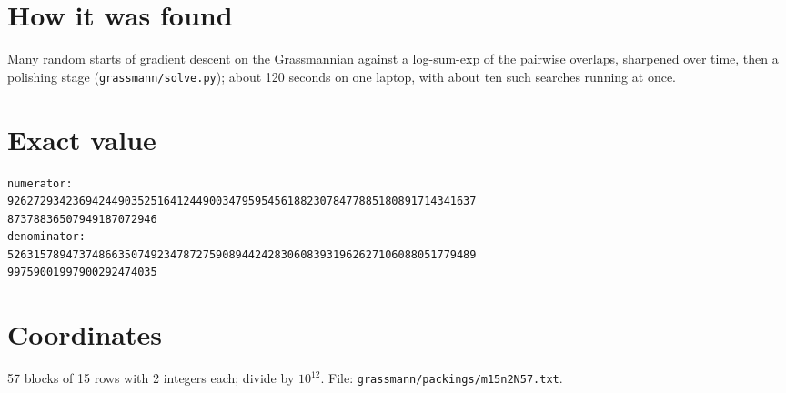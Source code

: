 \documentclass[11pt,a4paper]{article}
\begin{document}
\section{How it was found}
Many random starts of gradient descent on the Grassmannian against a log-sum-exp of the pairwise overlaps, sharpened over time, then a polishing stage (\texttt{grassmann/solve.py}); about 120 seconds on one laptop, with about ten such searches running at once.


\appendix
\section{Exact value}
{\small
\begin{verbatim}
numerator:
926272934236942449035251641244900347959545618823078477885180891714341637
87378836507949187072946
denominator:
526315789473748663507492347872759089442428306083931962627106088051779489
99759001997900292474035
\end{verbatim}}

\section{Coordinates}
57 blocks of 15 rows with 2 integers each; divide by $10^{12}$. File: \texttt{grassmann/packings/m15n2N57.txt}.
{\tiny
\begin{multicols}{4}
\end{multicols}}
\end{document}

